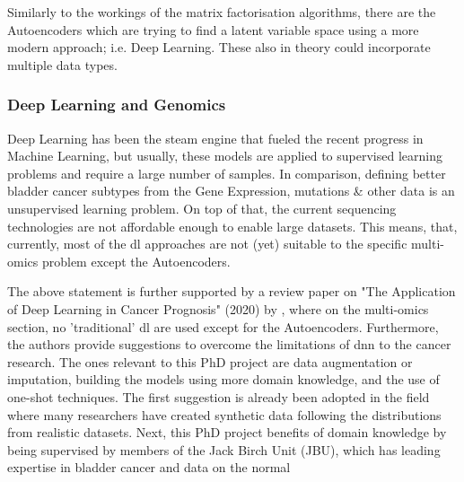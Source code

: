 Similarly to the workings of the matrix factorisation algorithms, there are the Autoencoders which are trying to find a latent variable space using a more modern approach; i.e. Deep Learning. These also in theory could incorporate multiple data types.

\subsubsection{Deep Learning  and Genomics} \label{s:lit:dl_genomics}

\vspace{3mm}
\vspace{3mm}

Deep Learning has been the steam engine that fueled the recent progress in Machine Learning, but usually, these models are applied to supervised learning problems and require a large number of samples. In comparison, defining better bladder cancer subtypes from the Gene Expression, mutations \& other data is an unsupervised learning problem. On top of that, the current sequencing technologies are not affordable enough to enable large datasets. This means, that, currently, most of the \acrshort{dl} approaches are not (yet) suitable to the specific multi-omics problem except the Autoencoders.

The above statement is further supported by a review paper on "The Application of Deep Learning in Cancer Prognosis" (2020) by \citet{Zhu2020-cv}, where on the multi-omics section, no 'traditional' \acrshort{dl} are used except for the Autoencoders. Furthermore, the authors provide suggestions to overcome the limitations of \acrshort{dnn} to the cancer research. The ones relevant to this PhD project are data augmentation or imputation, building the models using more domain knowledge, and the use of one-shot techniques. The first suggestion is already been adopted in the field where many researchers have created synthetic data \cite{Zhao2012-wj,Leiserson2015-yk} following the distributions from realistic datasets. Next, this PhD project benefits of domain knowledge by being supervised by members of the Jack Birch Unit (JBU), which has leading expertise in bladder cancer and data on the normal

